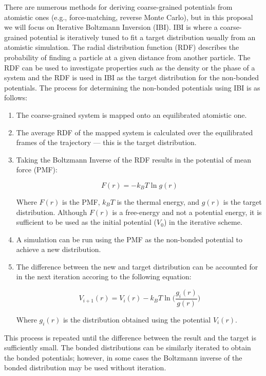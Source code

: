 There are numerous methods for deriving coarse-grained potentials from atomistic ones (e.g., force-matching, reverse Monte Carlo), but in this proposal we will focus on Iterative Boltzmann Inversion (IBI).
IBI is where a coarse-grained potential is iteratively tuned to fit a target distribution usually from an atomistic simulation\cite{Reith2003}.
The radial distribution function (RDF) describes the probability of finding a particle at a given distance from another particle.
The RDF can be used to investigate properties such as the density or the phase of a system and the RDF is used in IBI as the target distribution for the non-bonded potentials. %
The process for determining the non-bonded potentials using IBI is as follows:
\begin{enumerate}
    \item 
        The coarse-grained system is mapped onto an equilibrated atomistic one.

    \item 
        The average RDF of the mapped system is calculated over the equilibrated frames of the trajectory --- this is the target distribution.

    \item 
        Taking the Boltzmann Inverse of the RDF results in the potential of mean force (PMF):
        
        \[
            F(r) = -k_{B}T \ln g(r)
        \]
        
        Where $F(r)$ is the PMF, $k_{B}T$ is the thermal energy, and $g(r)$ is the target distribution.
        Although $F(r)$ is a free-energy and not a potential energy, it is sufficient to be used as the initial potential ($V_{0}$) in the iterative scheme\cite{Reith2003}.

    \item
        A simulation can be run using the PMF as the non-bonded potential to achieve a new distribution.

    \item
        The difference between the new and target distribution can be accounted for in the next iteration accoring to the following equation:
        
        \[
            V_{i+1}(r) = V_{i}(r) - k_{B}T \ln\bigg(\frac{g_{i}(r)}{g(r)}\bigg)
        \]

        Where $g_{i}(r)$ is the distribution obtained using the potential $V_{i}(r)$.

\end{enumerate}
This process is repeated until the difference between the result and the target is sufficiently small. 
The bonded distributions can be similarly iterated to obtain the bonded potentials; however, in some cases the Boltzmann inverse of the bonded distribution may be used without iteration\cite{Reith2003}.

